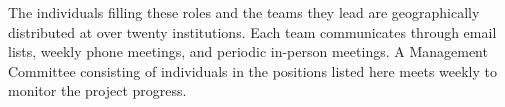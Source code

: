 The individuals filling these roles and the teams they lead are
geographically distributed at over twenty institutions. Each team
communicates through email lists, weekly phone meetings, and periodic
in-person meetings. A Management Committee consisting of individuals
in the positions listed here meets weekly to monitor the project
progress.

